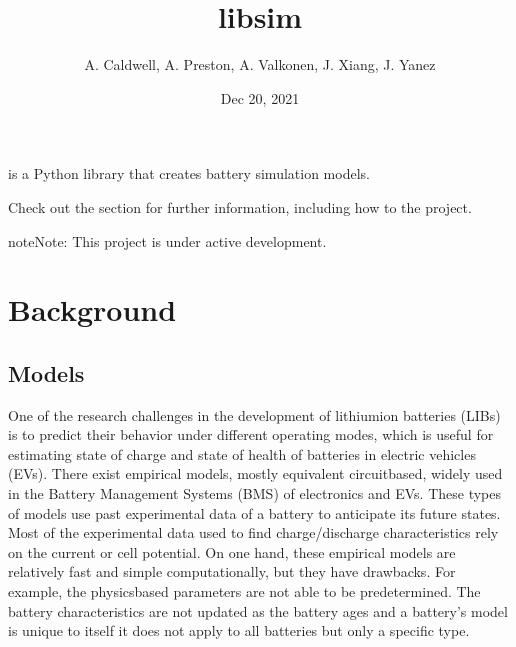 \documentclass[letterpaper,10pt,english]{sphinxmanual}
\title{libsim}
\date{Dec 20, 2021}
\author{A.\@{} Caldwell, A.\@{} Preston, A.\@{} Valkonen, J.\@{} Xiang, J.\@{} Yanez}
\begin{document}
\pagestyle{empty}
\sphinxmaketitle
\pagestyle{plain}
\sphinxtableofcontents
\pagestyle{normal}
\label{\detokenize{index::doc}}


\sphinxAtStartPar
{} is a Python library that creates battery simulation models.

\sphinxAtStartPar
Check out the {\hyperref[\detokenize{usage::doc}]{}} section for further information, including how to {\hyperref[\detokenize{usage:installation}]{}} the project.

\begin{sphinxadmonition}{note}{Note:}
\sphinxAtStartPar
This project is under active development.
\end{sphinxadmonition}


\chapter{Background}
\label{\detokenize{background:background}}\label{\detokenize{background::doc}}

\section{Models}
\label{\detokenize{background:models}}
\sphinxAtStartPar
One of the research challenges in the development of lithium\sphinxhyphen{}ion batteries
(LIBs) is to predict their behavior under different operating modes, which
is useful for estimating state of charge and state of health of batteries
in electric vehicles (EVs). There exist empirical models, mostly equivalent
circuit\sphinxhyphen{}based, widely used in the Battery Management Systems (BMS) of
electronics and EVs. These types of models use past experimental data of a
battery to anticipate its future states. Most of the experimental data used
to find charge/discharge characteristics rely on the current or cell potential.
On one hand, these empirical models are relatively fast and simple computationally,
but they have drawbacks. For example, the physics\sphinxhyphen{}based parameters are not
able to be predetermined. The battery characteristics are not updated as the
battery ages and a battery’s model is unique to itself \sphinxhyphen{} it does not apply to
all batteries but only a specific type.
\end{document}
